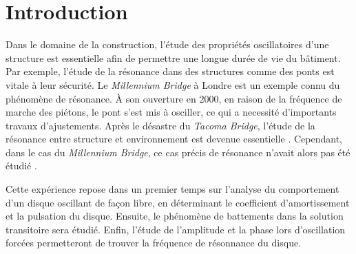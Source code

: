 \section{Introduction}

Dans le domaine de la construction, l'étude des propriétés oscillatoires d'une structure est essentielle afin de permettre une longue durée de vie du bâtiment. Par exemple, l'étude de la résonance dans des structures comme des ponts est vitale à leur sécurité. Le \textit{Millennium Bridge} à Londre est un exemple connu du phénomène de résonance. À son ouverture en 2000, en raison de la fréquence de marche des piétons, le pont s'est mis à osciller, ce qui a necessité d'importants travaux d'ajustements. Après le désastre du \textit{Tacoma Bridge}, l'étude de la résonance entre structure et environnement est devenue essentielle \cite{autre-pont-foireux}. Cependant, dans le cas du \textit{Millennium Bridge}, ce cas précis de résonance n'avait alors pas été étudié \cite{pont-foireux}.

Cette expérience repose dans un premier temps sur l'analyse du comportement d'un disque oscillant de façon libre, en déterminant le coefficient d'amortissement et la pulsation du disque. Ensuite, le phénomène de battements dans la solution transitoire sera étudié. Enfin, l'étude de l'amplitude et la phase lors d'oscillation forcées permetteront de trouver la fréquence de résonnance du disque.
